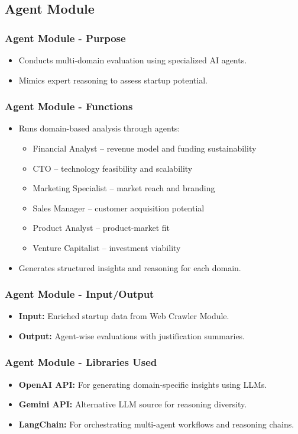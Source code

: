 \documentclass{beamer}
\begin{document}
\subsection{Agent Module}

\begin{frame}
\frametitle{Agent Module - Purpose}
\begin{itemize}
    \item Conducts multi-domain evaluation using specialized AI agents.
    \item Mimics expert reasoning to assess startup potential.
\end{itemize}
\end{frame}

\begin{frame}
\frametitle{Agent Module - Functions}
\begin{itemize}
    \item Runs domain-based analysis through agents:
    \begin{itemize}
        \item Financial Analyst – revenue model and funding sustainability
        \item CTO – technology feasibility and scalability
        \item Marketing Specialist – market reach and branding
        \item Sales Manager – customer acquisition potential
        \item Product Analyst – product-market fit
        \item Venture Capitalist – investment viability
    \end{itemize}
    \item Generates structured insights and reasoning for each domain.
\end{itemize}
\end{frame}

\begin{frame}
\frametitle{Agent Module - Input/Output}
\begin{itemize}
    \item \textbf{Input:} Enriched startup data from Web Crawler Module.
    \item \textbf{Output:} Agent-wise evaluations with justification summaries.
\end{itemize}
\end{frame}

\begin{frame}
\frametitle{Agent Module - Libraries Used}
\begin{itemize}
    \item \textbf{OpenAI API:} For generating domain-specific insights using LLMs.
    \item \textbf{Gemini API:} Alternative LLM source for reasoning diversity.
    \item \textbf{LangChain:} For orchestrating multi-agent workflows and reasoning chains.
\end{itemize}
\end{frame}
\end{document}
